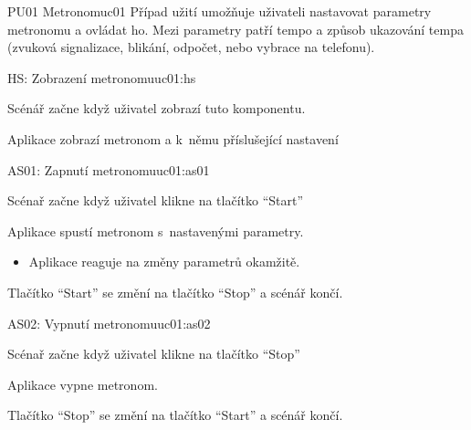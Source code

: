 \begin{usecase}{PU01 Metronom}{uc01}
    Případ užití umožňuje uživateli nastavovat parametry metronomu a ovládat ho. Mezi parametry patří tempo a způsob ukazování tempa (zvuková signalizace, blikání, odpočet, nebo vybrace na telefonu).

    \begin{scenario}{HS: Zobrazení metronomu}{uc01:hs}
        \item Scénář začne když uživatel zobrazí tuto komponentu.
        \item Aplikace zobrazí metronom a k~němu příslušející nastavení
    \end{scenario}

    \begin{scenario}{AS01: Zapnutí metronomu}{uc01:as01}
        \item Scénař začne když uživatel klikne na tlačítko \enquote{Start}
        \item Aplikace spustí metronom s~nastavenými parametry.
        \begin{itemize}
            \item Aplikace reaguje na změny parametrů okamžitě.
        \end{itemize}
        \item Tlačítko \enquote{Start} se změní na tlačítko \enquote{Stop} a scénář končí.
    \end{scenario}

    \begin{scenario}{AS02: Vypnutí metronomu}{uc01:as02}
        \item Scénař začne když uživatel klikne na tlačítko \enquote{Stop}
        \item Aplikace vypne metronom.
        \item Tlačítko \enquote{Stop} se změní na tlačítko \enquote{Start} a scénář končí.
    \end{scenario}
\end{usecase}